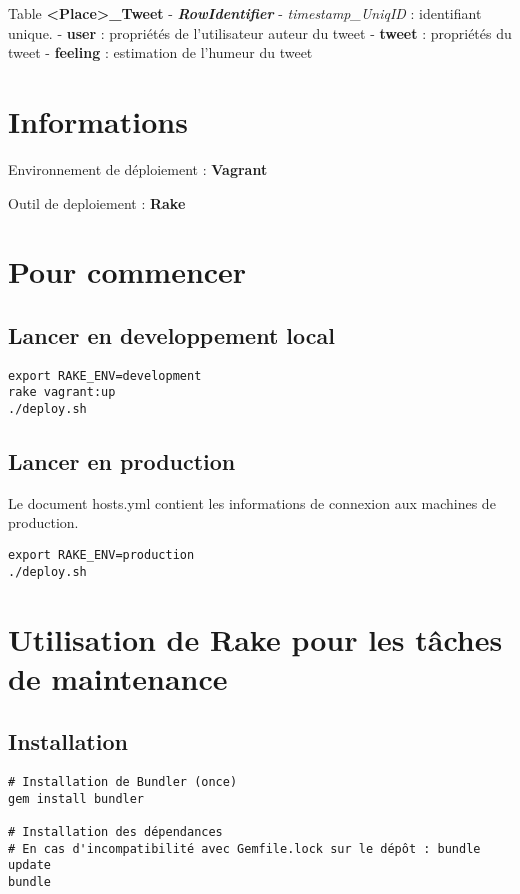 \documentclass[a4paper,oneside,11pt]{article}
\begin{document}
Table \textbf{<Place>\_Tweet}
- \textbf{\textit{RowIdentifier}} - \textit{timestamp\_UniqID} : identifiant unique.
- \textbf{user} : propriétés de l'utilisateur auteur du tweet
- \textbf{tweet} : propriétés du tweet
- \textbf{feeling} : estimation de l'humeur du tweet


\section{Informations}

Environnement de déploiement : \textbf{Vagrant}

Outil de deploiement : \textbf{Rake}

\section{Pour commencer}

\subsection{Lancer en developpement local}

\begin{verbatim}
export RAKE_ENV=development
rake vagrant:up
./deploy.sh
\end{verbatim}

\subsection{Lancer en production}

Le document hosts.yml contient les informations de connexion aux machines de production. 

\begin{verbatim}
export RAKE_ENV=production
./deploy.sh
\end{verbatim}


\section{Utilisation de Rake pour les tâches de maintenance}

\subsection{Installation}

\begin{verbatim}
# Installation de Bundler (once)
gem install bundler

# Installation des dépendances
# En cas d'incompatibilité avec Gemfile.lock sur le dépôt : bundle update
bundle
\end{verbatim}
\end{document}
